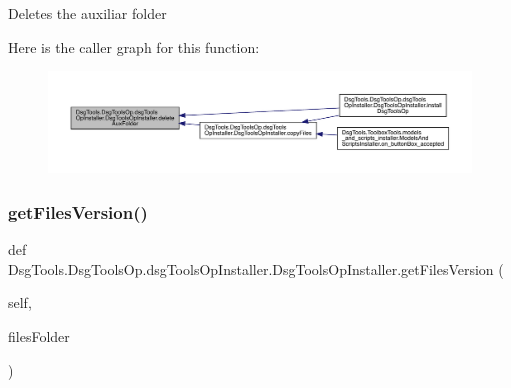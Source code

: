 \begin{DoxyVerb}Deletes the auxiliar folder
\end{DoxyVerb}
 Here is the caller graph for this function\+:
\nopagebreak
\begin{figure}[H]
\begin{center}
\leavevmode
\includegraphics[width=350pt]{class_dsg_tools_1_1_dsg_tools_op_1_1dsg_tools_op_installer_1_1_dsg_tools_op_installer_a5befb368651c765f8e147325cfcb8b04_icgraph}
\end{center}
\end{figure}
\mbox{\label{class_dsg_tools_1_1_dsg_tools_op_1_1dsg_tools_op_installer_1_1_dsg_tools_op_installer_a8e22feebedd9477ba954a452c2164c4e}} 
\subsubsection{\texorpdfstring{get\+Files\+Version()}{getFilesVersion()}}
{\footnotesize\ttfamily def Dsg\+Tools.\+Dsg\+Tools\+Op.\+dsg\+Tools\+Op\+Installer.\+Dsg\+Tools\+Op\+Installer.\+get\+Files\+Version (\begin{DoxyParamCaption}\item[{}]{self,  }\item[{}]{files\+Folder }\end{DoxyParamCaption})}

